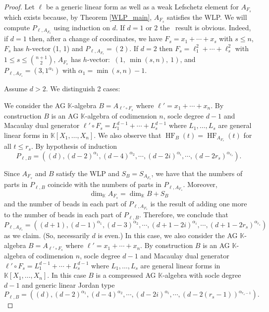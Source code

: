\documentclass[12pt,twoside]{amsart}
\numberwithin{equation}{section} \hyphenation{semi-stable}
\newcommand{\K}{\mathbb{K}}
\DeclareMathOperator{\HF}{HF}
\theoremstyle{definition}
\begin{document}
\begin{proof}
        
Let $\ell $ be a generic linear form as well as a weak Lefschetz element for $A_{F_s}$ which exists because, by Theorem  \ref{WLP_main}, $A_{F_s}$ satisfies the WLP. 
We will compute $P_{\ell,A_{F_s}}$ using induction on $d$. If $d=1$ or $2$ the \ result is obvious. Indeed, if $d=1$ then, after a change of coordinates, we have $F_s=x_1+\cdots +x_s$ with  $s\le n$, $ {F_s}$ has  $h$-vector (1, 1) and $P_{\ell, A_{F_s}}=(2)$. If $d=2$ then $F_s=\ell_1^2+\cdots +\ell_s^2$ with  $1\le s\le {n+1\choose 2}$,
$A_{F_s}$ has $h$-vector:  $ \ (1, \ \min(s,n), \ 1)$, and
$P_{\ell, A_{F_s}}=(3, 1^{\alpha_1})$ with $\alpha _1=\min(s,n)-1$. 

Assume $d>2$. We distinguish 2 cases:

\vskip 2mm
 We consider the AG $\K$-algebra $B=A_{\ell' \circ F_s}$ where $\ell'=x_1+\cdots +x_n$. 
By construction $B$ is an AG $\K$-algebra of codimension $n$, socle degree $d-1$ and Macaulay dual generator $\ell '\circ F_s=L_1^{d-1}+\cdots +L_s^{d-1}$  where $L_1, \ldots ,L_s$ are general linear forms in $\K[X_1,\ldots,X_n]$. We also observe that $\HF_B(t)=\HF_{A_{F_s}}(t)$ for all $t\le r_s$. By hypothesis of induction
$$ P_{\ell,B}= ((d), (d-2)^{\alpha_1},(d - 4)^{\alpha_2},\cdots,  (d-2i)^{\alpha _i}, \cdots , (d-2r_s)^{\alpha_{r_s}}).$$

Since $A_{F_s}$ and $B$ satisfy the WLP and $S_B=S_{A_{F_s}}$, we have that the numbers of parts in $P_{\ell, B}$
coincide with the numbers of parts in $P_{\ell, A_{F_s}}$. Moreover,
$$
\dim _{\K}A_{F_s}=\dim_{\K}B+S_B$$
and the number of beads in each part of $P_{\ell, A_{F_s}}$ is the result of adding one more to the number of beads in each part of $P_{\ell, B}$. Therefore, we conclude that
$$ P_{\ell,A_{F_s}}= ((d+1), (d-1)^{\alpha_1},(d - 3)^{\alpha_2},\cdots,  (d+1-2i)^{\alpha _i}, \cdots , (d+1-2r_s)^{\alpha_{r_s}})$$
as we claim.
\vskip 2mm
 (So, necessarily $d$ is even.)  In this case, we also consider the AG $\K$-algebra $B=A_{\ell' \circ F_s}$ where $\ell'=x_1+\cdots +x_n$. 
By construction $B$ is an AG $\K$-algebra of codimension $n$, socle degree $d-1$ and Macaulay dual generator $\ell '\circ F_s=L_1^{d-1}+\cdots +L_s^{d-1}$  where $L_1, \ldots ,L_s$ are general linear forms in $\K[X_1,\ldots,X_n]$. In this case $B$ is a compressed AG $\K$-algebra with socle degree $d-1$ and generic linear Jordan type
$$ P_{\ell,B}= ((d), (d-2)^{\alpha_1},(d - 4)^{\alpha_2},\cdots,  (d-2i)^{\alpha _i}, \cdots , (d-2(r_s-1))^{\alpha_{r_s-1}}).$$


\end{proof}
\end{document}
